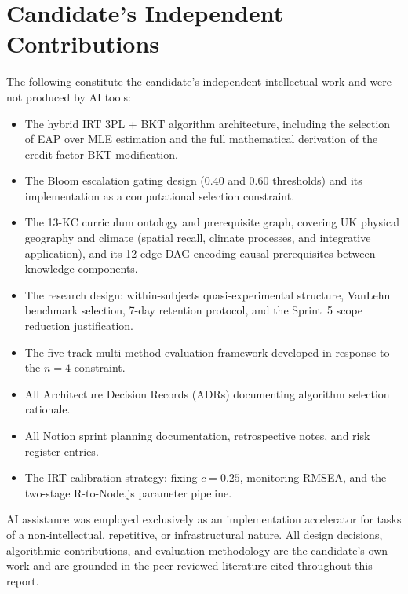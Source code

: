 \section*{Candidate's Independent Contributions}
\label{app:candidate_contributions}

The following constitute the candidate's independent intellectual work and
were not produced by AI tools:

\begin{itemize}[leftmargin=2em]
  \item The hybrid IRT 3PL + BKT algorithm architecture, including the
    selection of EAP over MLE estimation and the full mathematical
    derivation of the credit-factor BKT modification.
  \item The Bloom escalation gating design (0.40 and 0.60 thresholds) and
    its implementation as a computational selection constraint.
  \item The 13-KC curriculum ontology and prerequisite graph, covering UK
    physical geography and climate (spatial recall, climate processes, and
    integrative application), and its 12-edge DAG encoding causal
    prerequisites between knowledge components.
  \item The research design: within-subjects quasi-experimental structure,
    VanLehn benchmark selection, 7-day retention protocol, and the Sprint~5
    scope reduction justification.
  \item The five-track multi-method evaluation framework developed in
    response to the $n = 4$ constraint.
  \item All Architecture Decision Records (ADRs) documenting algorithm
    selection rationale.
  \item All Notion sprint planning documentation, retrospective notes, and
    risk register entries.
  \item The IRT calibration strategy: fixing $c = 0.25$, monitoring RMSEA,
    and the two-stage R-to-Node.js parameter pipeline.
\end{itemize}

AI assistance was employed exclusively as an implementation accelerator for
tasks of a non-intellectual, repetitive, or infrastructural nature. All
design decisions, algorithmic contributions, and evaluation methodology
are the candidate's own work and are grounded in the peer-reviewed
literature cited throughout this report.

